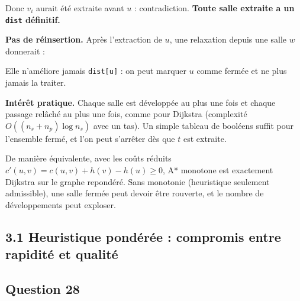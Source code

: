 \documentclass[11pt,a4paper]{article}
\newcommand{\equationajustee}[1]{%
  \sbox{\boiteequation}{$\displaystyle #1$}%
  \ifdim\wd\boiteequation>\linewidth
    \[\resizebox{\linewidth}{!}{\usebox{\boiteequation}}\]%
  \else
    \[#1\]%
  \fi}
\begin{document}
Donc \(v_i\) aurait été extraite avant \(u\) : contradiction. \textbf{Toute salle extraite a un \texttt{dist} définitif.}

\textbf{Pas de réinsertion.} Après l'extraction de \(u\), une relaxation depuis une salle \(w\) donnerait :

\equationajustee{\begin{aligned}
\texttt{dist}[w] + c(w,u) &\ge \delta(s,w) + c(w,u) \\
&\ge \delta(s,u) \\
&= \texttt{dist}[u].
\end{aligned}}

Elle n'améliore jamais \texttt{dist{[}u{]}} : on peut marquer \(u\) comme fermée et ne plus jamais la traiter.

\textbf{Intérêt pratique.} Chaque salle est développée au plus une fois et chaque passage relâché au plus une fois, comme pour Dijkstra (complexité \(O((n_s + n_p)\log n_s)\) avec un tas). Un simple tableau de booléens suffit pour l'ensemble fermé, et l'on peut s'arrêter dès que \(t\) est extraite.

De manière équivalente, avec les coûts réduits \(c'(u,v) = c(u,v) + h(v) - h(u) \ge 0\), A* monotone est exactement Dijkstra sur le graphe repondéré. Sans monotonie (heuristique seulement admissible), une salle fermée peut devoir être rouverte, et le nombre de développements peut exploser.

\hypertarget{heuristique-ponduxe9ruxe9e-compromis-entre-rapidituxe9-et-qualituxe9}{%
\subsection{3.1 Heuristique pondérée : compromis entre rapidité et qualité}\label{heuristique-ponduxe9ruxe9e-compromis-entre-rapidituxe9-et-qualituxe9}}

\hypertarget{question-28}{%
\subsection{Question 28}\label{question-28}}
\end{document}
